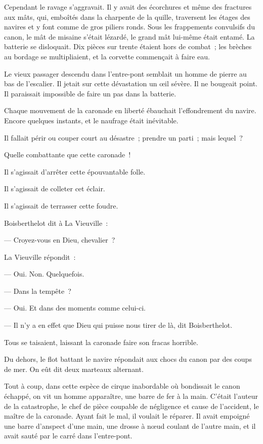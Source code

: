 \documentclass[french,twoside]{book} %
\begin{document}
Cependant le ravage s’aggravait. Il y avait des écorchures et même des fractures aux mâts, qui, emboîtés dans la charpente de la quille, traversent les étages des navires et y font comme de gros piliers ronds. Sous les frappements convulsifs du canon, le mât de misaine s’était lézardé, le grand mât lui-même était entamé. La batterie se disloquait. Dix pièces sur  trente étaient hors de combat ; les brèches au bordage se multipliaient, et la corvette commençait à faire eau.\par
Le vieux passager descendu dans l’entre-pont semblait un homme de pierre au bas de l’escalier. Il jetait sur cette dévastation un œil sévère. Il ne bougeait point. Il paraissait impossible de faire un pas dans la batterie.\par
Chaque mouvement de la caronade en liberté ébauchait l’effondrement du navire. Encore quelques instants, et le naufrage était inévitable.\par
Il fallait périr ou couper court au désastre ; prendre un parti ; mais lequel ?\par
Quelle combattante que cette caronade !\par
Il s’agissait d’arrêter cette épouvantable folle.\par
Il s’agissait de colleter cet éclair.\par
Il s’agissait de terrasser cette foudre.\par
Boisberthelot dit à La Vieuville :\par
— Croyez-vous en Dieu, chevalier ?\par
La Vieuville répondit :\par
— Oui. Non. Quelquefois.\par
— Dans la tempête ?\par
— Oui. Et dans des moments comme celui-ci.\par
— Il n’y a en effet que Dieu qui puisse nous tirer de là, dit Boisberthelot.\par
Tous se taisaient, laissant la caronade faire son fracas horrible.\par
Du dehors, le flot battant le navire répondait aux chocs du canon par des coups de mer. On eût dit deux marteaux alternant.\par
 Tout à coup, dans cette espèce de cirque inabordable où bondissait le canon échappé, on vit un homme apparaître, une barre de fer à la main. C’était l’auteur de la catastrophe, le chef de pièce coupable de négligence et cause de l’accident, le maître de la caronade. Ayant fait le mal, il voulait le réparer. Il avait empoigné une barre d’anspect d’une main, une drosse à nœud coulant de l’autre main, et il avait sauté par le carré dans l’entre-pont.\par
\end{document}
